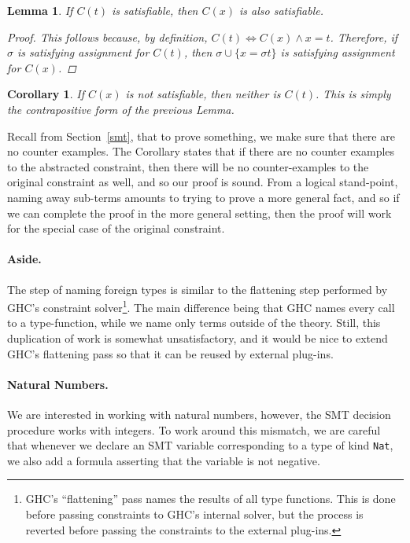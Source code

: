 \documentclass{sigplanconf}
\newtheorem*{lemma}{Lemma}
\newtheorem*{corollary}{Corollary}
\begin{document}
\begin{lemma}
If $C(t)$ is satisfiable, then $C(x)$ is also satisfiable.
\begin{proof} This follows because, by definition,
$C(t) \iff C(x) \wedge x = t$. Therefore, if $\sigma$ is satisfying
assignment for $C(t)$, then $\sigma \cup \{ x = \sigma t \}$ is satisfying
assignment for $C(x)$.
\end{proof}
\end{lemma}

\begin{corollary} If $C(x)$ is not satisfiable, then neither is $C(t)$.
This is simply the contrapositive form of the previous Lemma.
\end{corollary}

Recall from Section~\ref{smt}, that to prove something, we make sure
that there are no counter examples.  The Corollary states that if there
are no counter examples to the abstracted constraint, then there will
be no counter-examples to the original constraint as well, and so our
proof is sound.  From a logical stand-point, naming away sub-terms
amounts to trying to prove a more general fact, and so if we can complete
the proof in the more general setting, then the proof will work for
the special case of the original constraint.

\paragraph{Aside.}
The step of naming foreign types is similar to the flattening step performed
by GHC's constraint solver\footnote{GHC's ``flattening'' pass names the
results of all type functions.  This is done before passing constraints
to GHC's internal solver, but the process is reverted before passing the
constraints to the external plug-ins. }.
The main difference being that GHC names every
call to a type-function, while we name only terms outside of the theory.
Still, this duplication of work is somewhat unsatisfactory, and it would
be nice to extend GHC's flattening pass so that it can be reused by
external plug-ins.

\paragraph{Natural Numbers.}
We are interested in working with natural numbers, however, the SMT
decision procedure works with integers.  To work around this mismatch,
we are careful that whenever we declare an SMT variable corresponding
to a type of kind \Verb"Nat", we also add a formula asserting that
the variable is not negative.
\end{document}
